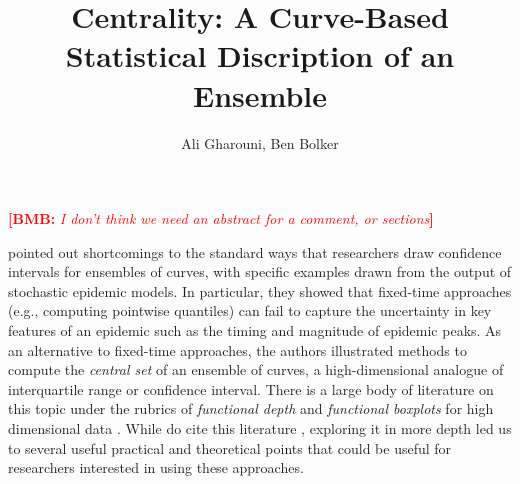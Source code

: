 \documentclass[12pt]{article}
\title{Centrality: A Curve-Based Statistical Discription of an Ensemble}
\author{Ali Gharouni, Ben Bolker}
\newcommand{\comment}{\showcomment}
\newcommand{\showcomment}[3]{\textcolor{#1}{\textbf{[#2: }\textsl{#3}\textbf{]}}}
\newcommand{\bmb}[1]{\comment{red}{BMB}{#1}}
\theoremstyle{definition} %
\begin{document}
\maketitle
\linenumbers



\bmb{I don't think we need an abstract for a comment, or sections}

\cite{juul2021fixed} pointed out shortcomings to the standard ways that researchers draw confidence intervals for ensembles of curves, with specific examples drawn from the output of stochastic epidemic models. In particular, they showed that fixed-time approaches (e.g., computing pointwise quantiles) can fail to capture the uncertainty in key features of an epidemic such as the timing and magnitude of epidemic peaks.  As an alternative to fixed-time approaches, the authors illustrated methods to compute the \emph{central set} of an ensemble of curves, a high-dimensional analogue of interquartile range or confidence interval. There is a large body of literature on this topic under the rubrics of \emph{functional depth} and \emph{functional boxplots} for high dimensional data \citep{fraiman2001trimmed, lopez2007depth, lopez2009concept, sun2011functional,sun2012exact}. While \cite{juul2021fixed} do cite this literature \citep{sun2011functional}, exploring it in more depth led us to several useful practical and theoretical points that could be useful for researchers interested in using these approaches.
\end{document}
